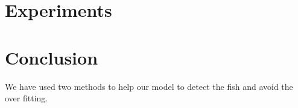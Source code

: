 \documentclass[conference]{IEEEtran}
\begin{document}





\section{Experiments}


\section{Conclusion}
We have used two methods to help our model to detect the fish and avoid the over fitting.


%
%
%






\end{document}
